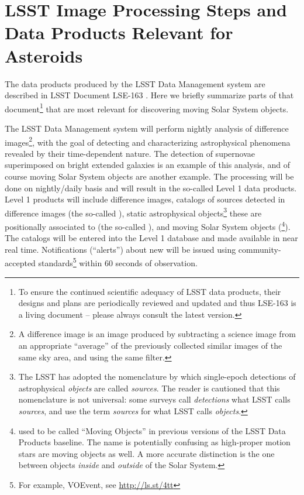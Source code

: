 \section{LSST Image Processing Steps and Data Products Relevant for Asteroids} \label{sec:AppA}

The data products produced by the LSST Data Management system are described in
LSST Document LSE-163 \citep[LSST Data Products
Definition Document,][]{LSE-163}. Here we briefly summarize parts of that
document\footnote{To ensure the continued scientific adequacy of LSST data
products, their designs and plans are periodically reviewed and updated and
thus LSE-163 is a living document -- please always consult the latest version.}
that are most relevant for discovering moving Solar System objects.

The LSST Data Management system will perform nightly analysis of difference images\footnote{A difference
image is an image produced by subtracting a science image from an appropriate
``average'' of the previously collected similar images of the same sky area, and using the
same filter.}, with the goal of detecting and characterizing astrophysical phenomena
revealed by their time-dependent nature. The detection of supernovae superimposed
on bright extended galaxies is an example of this analysis, and of course moving Solar
System objects are another example. The processing will be done on nightly/daily
basis and will result in the so-called Level 1 data products. Level 1 products will include
difference images, catalogs of sources detected in difference images (the so-called
\DIASources), static astrophysical objects\footnote{The LSST has adopted the nomenclature by
which single-epoch detections of astrophysical {\em objects} are called {\em sources}.
The reader is cautioned that this nomenclature is not universal: some surveys call
{\em detections} what LSST calls {\em sources}, and use the term {\em sources} for what
LSST calls {\em objects}.} these \DIASources are positionally associated to (the so-called \DIAObjects),
and moving Solar System objects (\SSObjects\footnote{\SSObjects used to be called
``Moving Objects'' in previous versions of the LSST Data Products baseline. The name is
potentially confusing as high-proper motion stars are moving objects as well. A more
accurate distinction is the one between objects {\em inside} and {\em outside} of the Solar
System.}). The catalogs will be entered into the Level 1 database and made available in near
real time. Notifications (``alerts'') about new \DIASources will be issued using
community-accepted standards\footnote{For example, VOEvent, see \url{http://ls.st/4tt}} within
60 seconds of observation.

